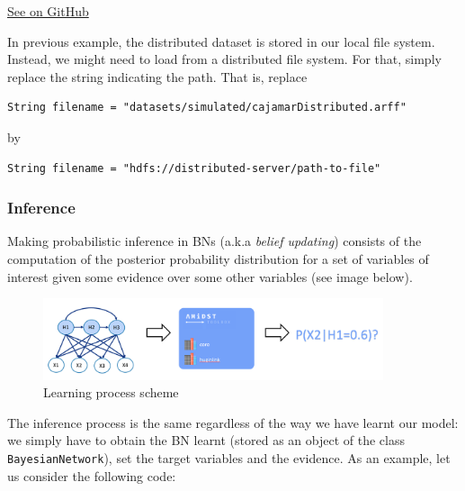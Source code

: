 \documentclass[10pt,a4paper]{article}
\begin{document}
\href{https://github.com/amidst/tutorial/blob/master/src/main/java/eu/amidst/tutorial/usingAmidst/examples/StaticModelFlink.java}{See on GitHub}
\vspace{3mm}


In previous example, the distributed dataset is stored in our local file system. Instead, we might need to load from a distributed file system. For that, simply replace the string indicating the path. That is, replace


\begin{verbatim}
String filename = "datasets/simulated/cajamarDistributed.arff"
\end{verbatim}


\noindent by


\begin{verbatim}
String filename = "hdfs://distributed-server/path-to-file"
\end{verbatim}



\subsubsection{Inference}\label{sec:lvmodels:static:inference}



Making probabilistic inference in BNs (a.k.a \textit{belief updating}) consists of the computation of the posterior probability distribution for a set of variables of interest given some evidence over some other variables (see image below). 


\begin{figure}[h!]
	\centering
	\includegraphics[width=10cm]{img/staticinference.png}
	\caption{Learning process scheme}
	\label{fig:lvmodels:static:inference:scheme}	
\end{figure}

The inference process is the same regardless of the way we have learnt our model: we simply have to obtain the BN learnt (stored as an object of the class \texttt{BayesianNetwork}), set the target variables and the evidence. As an example, let us consider the following code:
\end{document}
